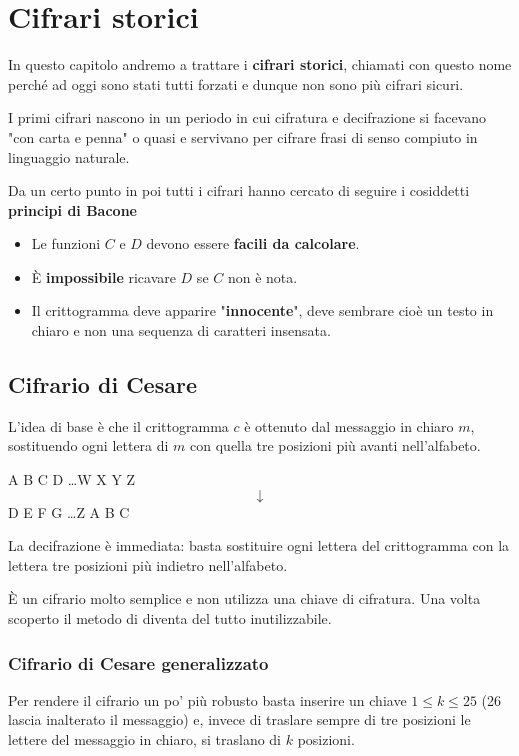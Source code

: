 \chapter{Cifrari storici}\label{storici}
In questo capitolo andremo a trattare i \textbf{cifrari storici}, chiamati con questo nome perch\'e ad oggi sono stati
tutti forzati e dunque non sono pi\`u cifrari sicuri.

I primi cifrari nascono in un periodo in cui cifratura e decifrazione si facevano "con carta e penna" o quasi e servivano
per cifrare frasi di senso compiuto in linguaggio naturale.

Da un certo punto in poi tutti i cifrari hanno cercato di seguire i cosiddetti \textbf{principi di Bacone}
\begin{itemize}
	\item Le funzioni $C$ e $D$ devono essere \textbf{facili da calcolare}.
	\item \`E \textbf{impossibile} ricavare $D$ se $C$ non \`e nota.
	\item Il crittogramma deve apparire "\textbf{innocente}", deve sembrare cio\`e un testo in chiaro e non una sequenza
	      di caratteri insensata.
\end{itemize}

\section{Cifrario di Cesare}\label{cesare}
L'idea di base \`e che il crittogramma $c$ \`e ottenuto dal messaggio in chiaro $m$, sostituendo ogni lettera di $m$ con
quella tre posizioni pi\`u avanti nell'alfabeto.

\begin{center}
	A B C D \dots W X Y Z
	\[ \downarrow \]
	D E F G \dots Z A B C
\end{center}
La decifrazione \`e immediata: basta sostituire ogni lettera del crittogramma con la lettera tre posizioni pi\`u indietro
nell'alfabeto.

\`E un cifrario molto semplice e non utilizza una chiave di cifratura. Una volta scoperto il metodo di diventa del tutto
inutilizzabile.

\subsection{Cifrario di Cesare generalizzato}
Per rendere il cifrario un po' pi\`u robusto basta inserire un chiave $1 \leq k \leq 25$ (26 lascia inalterato il
messaggio) e, invece di traslare sempre di tre posizioni le lettere del messaggio in chiaro, si traslano di $k$
posizioni.

